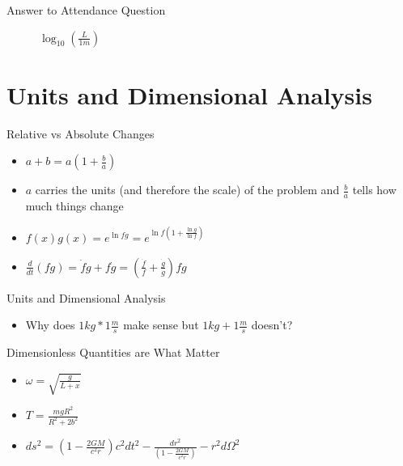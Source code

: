 \documentclass[10pt,xcolor={table,dvipsnames},t]{beamer}
\begin{document}
\begin{frame}{Answer to Attendance Question}
\begin{figure}
\begin{tikzpicture}
        \end{tikzpicture}
        \caption{$\log_{10}\left(\frac{L}{1 m}\right)$}
        \label{fig:progress}
    \end{figure}



\end{frame}

\section{Units and Dimensional Analysis}

\begin{frame}{Relative vs Absolute Changes}

\begin{itemize}
  \item $a+b = a\left( 1 + \frac{b}{a}\right)$
  \item $a$ carries the units (and therefore the scale) of the problem and $\frac{b}{a}$ tells how much things change
  \item $f(x)g(x) = e^{\ln{fg}} = e^{\ln{f}\left( 1 + \frac{\ln{g}}{\ln{f}}\right)}$
  \item $\frac{d}{dt}(fg) = \dot{f}g + f\dot{g} = \left( \frac{\dot{f}}{f} + \frac{\dot{g}}{g} \right) fg$
\end{itemize}

\end{frame}

\begin{frame}{Units and Dimensional Analysis}
    \begin{itemize}
        \item Why does $1kg*1\frac{m}{s}$ make sense but $1kg + 1\frac{m}{s}$ doesn't?
    \end{itemize}
\end{frame}

\begin{frame}{Dimensionless Quantities are What Matter}
    \begin{itemize}
        \item $\omega = \sqrt{\frac{g}{L + x}}$
        \item $T = \frac{mgR^2}{R^2 + 2b^2}$
        \item $ds^2 = \left(1 - \frac{2GM}{c^2 r}\right)c^2dt^2 - \frac{dr^2}{\left(1 - \frac{2GM}{c^2 r}\right)} - r^2 d\Omega^2$
    \end{itemize}
\end{frame}
\end{document}

